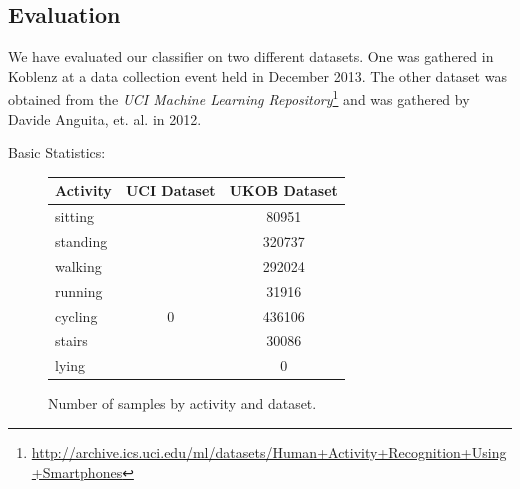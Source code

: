 

\subsection{Evaluation}\label{sec:har_eval}

We have evaluated our classifier on two different datasets.  One was
gathered in Koblenz at a data collection event held in December 2013.
The other dataset was obtained from the {\it UCI Machine Learning
  Repository}\footnote{\url{http://archive.ics.uci.edu/ml/datasets/Human+Activity+Recognition+Using+Smartphones}}
and was gathered by Davide Anguita, et. al. \cite{Anguita} in 2012.

Basic Statistics:
\begin{figure}
\centering
\begin{tabular}{|l|c|c|} \hline
Activity  & UCI Dataset & UKOB Dataset \\ \hline
sitting   &             & 80951        \\
standing  &             & 320737       \\
walking   &             & 292024       \\
running   &             & 31916        \\
cycling   & 0           & 436106       \\
stairs    &             & 30086        \\
lying     &             & 0            \\ \hline
\end{tabular}
\caption{Number of samples by activity and dataset.}
\end{figure}


